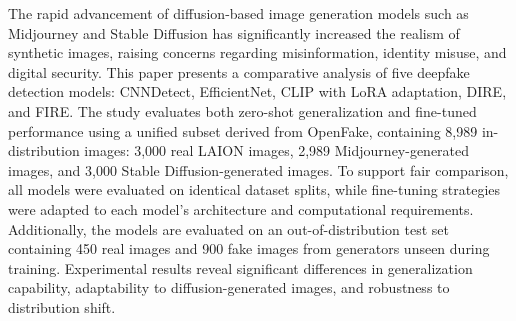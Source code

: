 The rapid advancement of diffusion-based image generation models such as Midjourney and Stable Diffusion has significantly increased the realism of synthetic images, raising concerns regarding misinformation, identity misuse, and digital security. This paper presents a comparative analysis of five deepfake detection models: CNNDetect, EfficientNet, CLIP with LoRA adaptation, DIRE, and FIRE. The study evaluates both zero-shot generalization and fine-tuned performance using a unified subset derived from OpenFake, containing 8,989 in-distribution images: 3,000 real LAION images, 2,989 Midjourney-generated images, and 3,000 Stable Diffusion-generated images. To support fair comparison, all models were evaluated on identical dataset splits, while fine-tuning strategies were adapted to each model's architecture and computational requirements. Additionally, the models are evaluated on an out-of-distribution test set containing 450 real images and 900 fake images from generators unseen during training. Experimental results reveal significant differences in generalization capability, adaptability to diffusion-generated images, and robustness to distribution shift.
